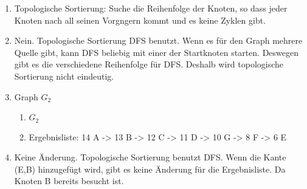 \documentclass[12pt]{scrartcl}
\begin{document}
\begin{enumerate}
  \item Topologische Sortierung: Suche die Reihenfolge der Knoten, so dass jeder Knoten nach all seinen Vorgngern kommt und es keine Zyklen gibt.
  \item Nein. Topologische Sortierung DFS benutzt. Wenn es für den Graph mehrere Quelle gibt, kann DFS beliebig mit einer der Startknoten starten. Deswegen gibt es die
  verschiedene Reihenfolge für DFS. Deshalb wird topologische Sortierung nicht eindeutig.
  \item Graph $G_2$
  \begin{enumerate}
    \item $G_2$
    \item Ergebnisliste: 14 A -> 13 B -> 12 C -> 11 D -> 10 G -> 8 F -> 6 E
  \end{enumerate}
  \item Keine Änderung. Topologische Sortierung benutzt DFS. Wenn die Kante (E,B) hinzugefügt wird, gibt es keine Änderung für die Ergebnisliste. Da Knoten B bereits besucht ist.
\end{enumerate}
\end{document}
